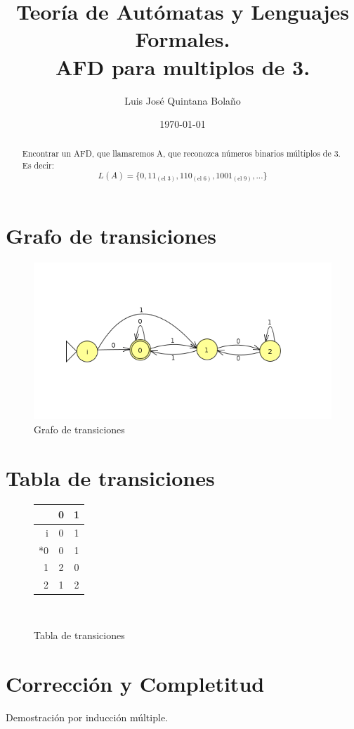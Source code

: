 \documentclass[a4paper]{article}
\title{Teoría de Autómatas y Lenguajes Formales.\\ AFD para multiplos de 3. }
\author{Luis José Quintana Bolaño}
\date{\today}
\begin{document}
		\maketitle
		\begin{abstract}
		    Encontrar un AFD, que llamaremos A, que reconozca números binarios múltiplos de 3. Es decir:
		    $$L(A)=\{0,11_{(\text{el 3})},110_{(\text{el 6})},1001_{(\text{el 9})},...\}$$
  		\end{abstract}

  		\section{Grafo de transiciones}
  			\begin{figure}[!h]
  			\centering
  			\includegraphics[trim= 30 100 50 80,clip]{DFA.png}
  			\caption{Grafo de transiciones}
  			\end{figure}
  		\section{Tabla de transiciones}
  			\begin{figure}[!h]
  			\centering
  			\begin{tabular}{r|c|c|} 
  				   & 0 & 1 \\ \hline
  				i  & 0 & 1 \\ \hline
			    *0  & 0 & 1 \\ \hline
			    1  & 2 & 0 \\ \hline
			    2  & 1 & 2 \\ \hline
  		    \end{tabular} \\
  		    \caption{Tabla de transiciones}
  		    \end{figure}
  		\section{Corrección y Completitud}
  		Demostración por inducción múltiple.
\end{document}
